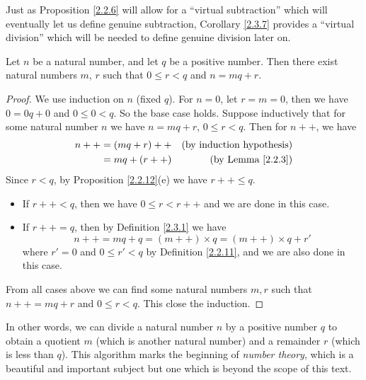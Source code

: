 \begin{remark}\label{2.3.8}
    Just as Proposition \ref{2.2.6} will allow for a ``virtual subtraction'' which will eventually let us define genuine subtraction, Corollary \ref{2.3.7} provides a ``virtual division'' which will be needed to define genuine division later on.
\end{remark}

\begin{proposition}\label{2.3.9}
    Let \(n\) be a natural number, and let \(q\) be a positive number.
    Then there exist natural numbers \(m\), \(r\) such that \(0 \leq r < q\) and \(n = mq + r\).
\end{proposition}

\begin{proof}
    We use induction on \(n\) (fixed \(q\)).
    For \(n = 0\), let \(r = m = 0\), then we have \(0 = 0q + 0\) and \(0 \leq 0 < q\).
    So the base case holds.
    Suppose inductively that for some natural number \(n\) we have \(n = mq + r\), \(0 \leq r < q\).
    Then for \(n++\), we have
    \begin{align*}
        n++ & = (mq + r)++ & \text{(by induction hypothesis)} \\
            & = mq + (r++) & \text{(by Lemma \ref{2.2.3})}    \\
    \end{align*}
    Since \(r < q\), by Proposition \ref{2.2.12}(e) we have \(r++ \leq q\).
    \begin{itemize}
        \item If \(r++ < q\), then we have \(0 \leq r < r++\) and we are done in this case.
        \item If \(r++ = q\), then by Definition \ref{2.3.1} we have
              \[
                  n++ = mq + q = (m++) \times q = (m++) \times q + r'
              \]
              where \(r' = 0\) and \(0 \leq r' < q\) by Definition \ref{2.2.11}, and we are also done in this case.
    \end{itemize}
    From all cases above we can find some natural numbers \(m, r\) such that \(n++ = mq + r\) and \(0 \leq r < q\).
    This close the induction.
\end{proof}

\begin{remark}\label{2.3.10}
    In other words, we can divide a natural number \(n\) by a positive number \(q\) to obtain a quotient \(m\) (which is another natural number) and a remainder \(r\) (which is less than \(q\)).
    This algorithm marks the beginning of \emph{number theory}, which is a beautiful and important subject but one which is beyond the scope of this text.
\end{remark}


